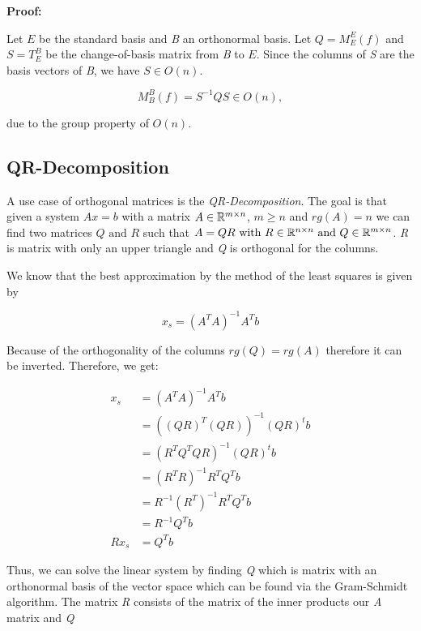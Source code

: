 \textbf{Proof:} 

Let \( E \) be the standard basis and \emph{B} an orthonormal basis. Let  
\( Q = M_E^E(f) \) and \( S = T_E^B \) be the change-of-basis matrix from \emph{B} to \( E \).  
Since the columns of \emph{S} are the basis vectors of \emph{B}, we have \( S \in O(n) \).  

\[
    M_B^B(f) = S^{-1} Q S \in O(n),
\]

due to the group property of \( O(n) \).

\QED

\subsection{QR-Decomposition}

A use case of orthogonal matrices is the \emph{QR-Decomposition}. The goal is that given a system 
\( Ax = b\) with a matrix \(A\in \mathbb{R}^{m \times n}\), \(m \ge n\) and \(rg(A) = n\) we can find 
two matrices \(Q \text{ and } R\) such that \(A = QR \text{ with } R\in \mathbb{R}^{n \times n} 
\text{ and } Q \in \mathbb{R}^{m \times n}\). \emph{R} is matrix with only an upper triangle and 
\emph{Q} is orthogonal for the columns.
\vspace{\baselineskip}

We know that the best approximation by the method of the least squares is given by

\[
    x_s = (A^T A)^{-1} A^T b
\]

Because of the orthogonality of the columns \(rg(Q) = rg(A)\) therefore it can be inverted. Therefore,
we get:

\begin{align*}
    x_s &= (A^T A)^{-1} A^T b \\
        &= ((QR)^T (QR))^{-1} (QR)^t b \\
        &= (R^T Q^T QR)^{-1} (QR)^t b \\
        &= (R^T R)^{-1} R^T Q^T b \\
        &=  R^{-1} (R^T)^{-1} R^T Q^T b \\
        &=  R^{-1} Q^T b \\
    Rx_s&= Q^T b
\end{align*}

Thus, we can solve the linear system by finding \emph{Q} which is matrix with an orthonormal basis of the 
vector space which can be found via the Gram-Schmidt algorithm. The matrix \emph{R} consists of the matrix of the 
inner products our \emph{A} matrix and \emph{Q}


